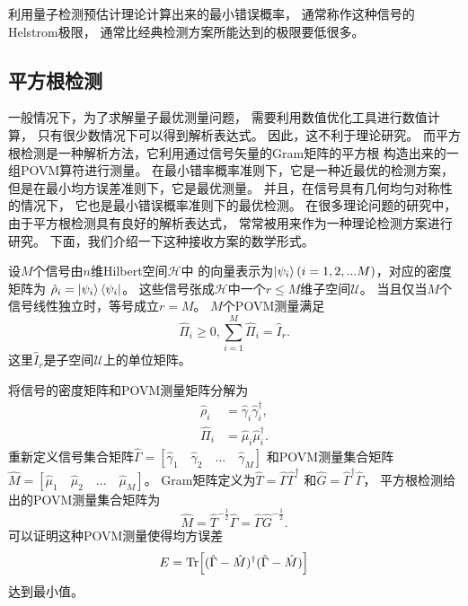 利用量子检测预估计理论计算出来的最小错误概率，
通常称作这种信号的Helstrom极限，
通常比经典检测方案所能达到的极限要低很多\cite{helstrom1976quantum}。



\subsection{平方根检测}
一般情况下，为了求解量子最优测量问题，
需要利用数值优化工具进行数值计算，
只有很少数情况下可以得到解析表达式。
因此，这不利于理论研究。
而平方根检测是一种解析方法，它利用通过信号矢量的Gram矩阵的平方根
构造出来的一组POVM算符进行测量\cite{hausladen1994pretty,hausladen1996classical}。
在最小错率概率准则下，它是一种近最优的检测方案，
但是在最小均方误差准则下，它是最优测量。
并且，在信号具有几何均匀对称性的情况下，
它也是最小错误概率准则下的最优检测\cite{kato1999quantum,eldar2001quantum,cariolaro2010performance,cariolaro2010theory}。
在很多理论问题的研究中，由于平方根检测具有良好的解析表达式，
常常被用来作为一种理论检测方案进行研究\cite{hausladen1996classical,sasaki1998quantum,guha2012polar}。
下面，我们介绍一下这种接收方案的数学形式。

设$M$个信号由$n$维Hilbert空间$\mathcal{H}$中
的向量表示为$\ket{\psi_i}(i=1,2,...M)$，对应的密度矩阵为
$\hat{\rho}_i = \ket{\psi_i} \bra{\psi_i}$。
这些信号张成$\mathcal{H}$中一个$r\le M$维子空间$\mathcal{U}$。
当且仅当$M$个信号线性独立时，等号成立$r=M$。
$M$个POVM测量满足
\begin{equation}
\hat{\Pi}_i \ge 0, \sum_{i=1}^M \hat{\Pi}_i = \hat{I}_r.
\end{equation}
这里$\hat{I}_r$是子空间$\mathcal{U}$上的单位矩阵。

将信号的密度矩阵和POVM测量矩阵分解为
\begin{equation}
\begin{split}
\hat{\rho}_i & = \hat{\gamma}_i \hat{\gamma}_i^\dagger,\\
\hat{\Pi}_i & = \hat{\mu}_i \hat{\mu}_i^\dagger.
\end{split}
\end{equation}
重新定义信号集合矩阵$\hat{\Gamma}=[\hat{\gamma}_1 \quad \hat{\gamma}_2 \quad ...\quad \hat{\gamma}_M]$
和POVM测量集合矩阵$\hat{M} = [\hat{\mu}_1\quad \hat{\mu}_2\quad ...\quad \hat{\mu}_M]$。
Gram矩阵定义为$\hat{T} = \hat{\Gamma} \hat{\Gamma}^\dagger$
和$\hat{G} = \hat{\Gamma}^\dagger \hat{\Gamma}$，
平方根检测给出的POVM测量集合矩阵为
\begin{equation}
\hat{M} = \hat{T}^{-\frac{1}{2}} \hat{\Gamma} = \hat{\Gamma} \hat{G}^{-\frac{1}{2}}.
\end{equation}
可以证明这种POVM测量使得均方误差
\begin{equation}
E = \Tr[(\hat{\Gamma} - \hat{M})^\dagger (\hat{\Gamma} - \hat{M})]
\end{equation}
达到最小值\cite{eldar2001quantum}。

